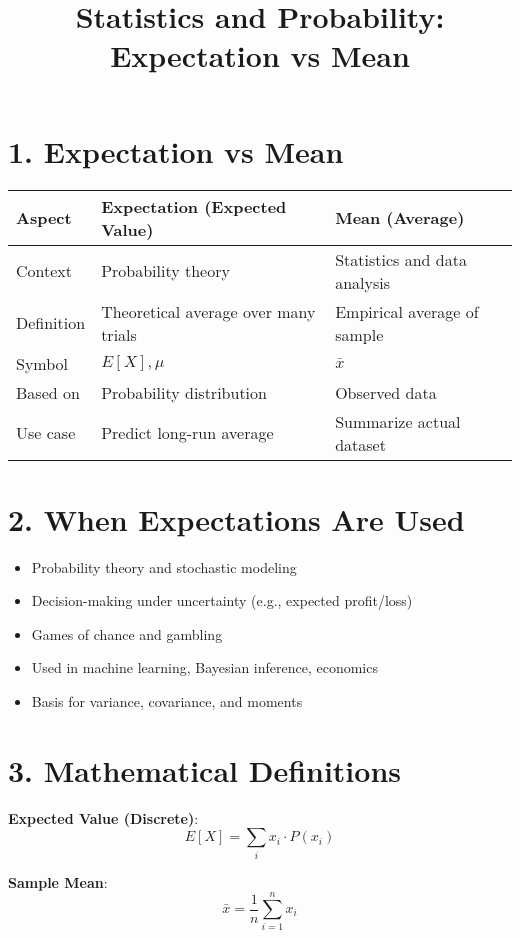 \documentclass[12pt]{article}
\title{\vspace{-2em}Statistics and Probability: Expectation vs Mean\vspace{-1em}}
\date{}
\begin{document}
\maketitle

\section*{1. Expectation vs Mean}

\begin{tabular}{@{}lll@{}}
\toprule
\textbf{Aspect} & \textbf{Expectation (Expected Value)} & \textbf{Mean (Average)} \\
\midrule
Context & Probability theory & Statistics and data analysis \\
Definition & Theoretical average over many trials & Empirical average of sample \\
Symbol & \( E[X], \mu \) & \( \bar{x} \) \\
Based on & Probability distribution & Observed data \\
Use case & Predict long-run average & Summarize actual dataset \\
\bottomrule
\end{tabular}

\section*{2. When Expectations Are Used}

\begin{itemize}
  \item Probability theory and stochastic modeling
  \item Decision-making under uncertainty (e.g., expected profit/loss)
  \item Games of chance and gambling
  \item Used in machine learning, Bayesian inference, economics
  \item Basis for variance, covariance, and moments
\end{itemize}

\section*{3. Mathematical Definitions}

\textbf{Expected Value (Discrete)}:
\[
E[X] = \sum_{i} x_i \cdot P(x_i)
\]

\textbf{Sample Mean}:
\[
\bar{x} = \frac{1}{n} \sum_{i=1}^{n} x_i
\]
\end{document}
